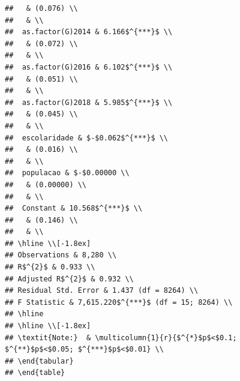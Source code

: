 \documentclass[
]{article}
\newenvironment{Shaded}{\begin{snugshade}}{\end{snugshade}}
\newcommand{\CommentTok}[1]{\textcolor[rgb]{0.56,0.35,0.01}{\textit{#1}}}
\newcommand{\DecValTok}[1]{\textcolor[rgb]{0.00,0.00,0.81}{#1}}
\newcommand{\FunctionTok}[1]{\textcolor[rgb]{0.13,0.29,0.53}{\textbf{#1}}}
\newcommand{\NormalTok}[1]{#1}
\newcommand{\OtherTok}[1]{\textcolor[rgb]{0.56,0.35,0.01}{#1}}
\newcommand{\SpecialCharTok}[1]{\textcolor[rgb]{0.81,0.36,0.00}{\textbf{#1}}}
\newcommand{\StringTok}[1]{\textcolor[rgb]{0.31,0.60,0.02}{#1}}
\begin{document}
\begin{verbatim}
##   & (0.076) \\ 
##   & \\ 
##  as.factor(G)2014 & 6.166$^{***}$ \\ 
##   & (0.072) \\ 
##   & \\ 
##  as.factor(G)2016 & 6.102$^{***}$ \\ 
##   & (0.051) \\ 
##   & \\ 
##  as.factor(G)2018 & 5.985$^{***}$ \\ 
##   & (0.045) \\ 
##   & \\ 
##  escolaridade & $-$0.062$^{***}$ \\ 
##   & (0.016) \\ 
##   & \\ 
##  populacao & $-$0.00000 \\ 
##   & (0.00000) \\ 
##   & \\ 
##  Constant & 10.568$^{***}$ \\ 
##   & (0.146) \\ 
##   & \\ 
## \hline \\[-1.8ex] 
## Observations & 8,280 \\ 
## R$^{2}$ & 0.933 \\ 
## Adjusted R$^{2}$ & 0.932 \\ 
## Residual Std. Error & 1.437 (df = 8264) \\ 
## F Statistic & 7,615.220$^{***}$ (df = 15; 8264) \\ 
## \hline 
## \hline \\[-1.8ex] 
## \textit{Note:}  & \multicolumn{1}{r}{$^{*}$p$<$0.1; $^{**}$p$<$0.05; $^{***}$p$<$0.01} \\ 
## \end{tabular} 
## \end{table}
\end{verbatim}

\begin{Shaded}
\end{Shaded}
\end{document}
